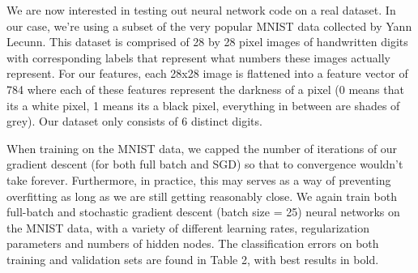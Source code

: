 \documentclass[10pt]{article}
\begin{document}
We are now interested in testing out neural network code on a real dataset. In our case, we're using a subset of the very popular MNIST data collected by Yann Lecunn. This dataset is comprised of 28 by 28 pixel images of handwritten digits with corresponding labels that represent what numbers these images actually represent. For our features, each 28x28 image is flattened into a feature vector of 784 where each of these features represent the darkness of a pixel (0 means that its a white pixel, 1 means its a black pixel, everything in between are shades of grey). Our dataset only consists of 6 distinct digits. 

When training on the MNIST data, we capped the number of iterations of our gradient descent (for both full batch and SGD) so that to convergence wouldn't take forever. Furthermore, in practice, this may serves as a way of preventing overfitting as long as we are still getting reasonably close. We again train both full-batch and stochastic gradient descent (batch size = 25) neural networks on the MNIST data, with a variety of different learning rates, regularization parameters and numbers of hidden nodes. The classification errors on both training and validation sets are found in Table 2, with best results in bold. 
\end{document}
